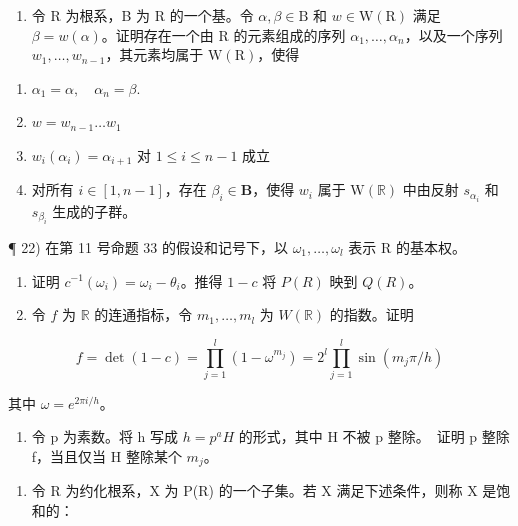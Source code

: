 \begin{enumerate}
\def\labelenumi{\arabic{enumi})}
\setcounter{enumi}{20}
\tightlist
\item
  令 R 为根系，B 为 R 的一个基。令 \(\alpha, \beta \in \mathrm{B}\) 和 \(w \in \mathrm{W}(\mathrm{R})\) 满足 \(\beta = w(\alpha)\)。证明存在一个由 R 的元素组成的序列 \(\alpha_1, \ldots, \alpha_n\)，以及一个序列 \(w_1, \ldots, w_{n-1}\)，其元素均属于 \(\mathrm{W}(\mathrm{R})\)，使得
\end{enumerate}

\begin{enumerate}
\def\labelenumi{(\roman{enumi})}
\item
  \(\alpha_{1} = \alpha, \quad \alpha_{n} = \beta.\)
\item
  \(w = w_{n - 1}\dots w_1\)
\item
  \(w_{i}(\alpha_{i}) = \alpha_{i + 1}\) 对 \(1\leqslant i\leqslant n - 1\) 成立
\item
  对所有 \(i \in [1, n - 1]\)，存在 \(\beta_i \in \mathbf{B}\)，使得 \(w_i\) 属于 \(\mathrm{W}(\mathbb{R})\) 中由反射 \(s_{\alpha_i}\) 和 \(s_{\beta_i}\) 生成的子群。
\end{enumerate}

¶ 22) 在第 11 号命题 33 的假设和记号下，以 \(\omega_{1},\ldots,\omega_{l}\) 表示 R 的基本权。

\begin{enumerate}
\def\labelenumi{\alph{enumi})}
\item
  证明 \(c^{-1}(\omega_i) = \omega_i - \theta_i\)。推得 \(1 - c\) 将 \(P(R)\) 映到 \(Q(R)\)。
\item
  令 \(f\) 为 \(\mathbb{R}\) 的连通指标，令 \(m_1, \ldots, m_l\) 为 \(W(\mathbb{R})\) 的指数。证明
\end{enumerate}

\[
f = \det (1 - c) = \prod_ {j = 1} ^ {l} \left(1 - \omega ^ {m _ {j}}\right) = 2 ^ {l} \prod_ {j = 1} ^ {l} \sin \left(m _ {j} \pi / h\right)
\]

其中 \(\omega = e^{2\pi i/h}\)。

\begin{enumerate}
\def\labelenumi{\alph{enumi})}
\setcounter{enumi}{2}
\tightlist
\item
  令 p 为素数。将 h 写成 \(h = p^{a}H\) 的形式，其中 H 不被 p 整除。~证明 p 整除 f，当且仅当 H 整除某个 \(m_{j}\)。
\end{enumerate}

\begin{enumerate}
\def\labelenumi{\arabic{enumi})}
\setcounter{enumi}{22}
\tightlist
\item
  令 R 为约化根系，X 为 P(R) 的一个子集。若 X 满足下述条件，则称 X 是饱和的：
\end{enumerate}

